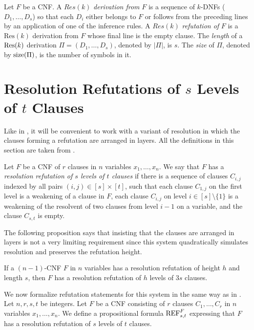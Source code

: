 \noindent Let $F$ be a CNF. A $\textit{Res}(k)$ \emph{derivation from} $F$ is a sequence of $k$-DNFs ($D_1,\ldots, D_s$) so that each $D_i$ either belongs to $F$ or follows from the preceding lines by an application of one of the inference rules. A $\textit{Res}(k)$ \emph{refutation of} $F$ is a $\text{Res}(k)$ derivation from $F$ whose final line is the empty clause. The \emph{length} of a $\textnormal{Res}(k)$ derivation $\Pi = (D_1,\ldots, D_s)$, denoted by $|\Pi|$, is $s$. The \emph{size} of $\Pi$, denoted by $\textnormal{size}(\Pi)$, is the number of symbols in it. 





\section{Resolution Refutations of $\textit{s}$ Levels of $\textit{t}$ Clauses}
\label{sec:res-refut-of-s-t-definition}
Like in \cite{Garlik2019-mfcs}, it will be convenient to work with a variant of resolution in  which the clauses forming a refutation are arranged in layers. All the definitions in this section are taken from \cite{Garlik2019-mfcs}.

\begin{definition}
 Let $F$ be a CNF of $r$ clauses in $n$ variables $x_1, \ldots, x_n$.  We say that $F$ has a \emph{resolution refutation of $s$ levels of $t$ clauses} if there is a sequence of clauses $C_{i,j}$ indexed by all pairs $(i,j) \in [s] \times [t]$, such that each clause $C_{1,j}$ on the first level is a weakening of a clause in $F$, each clause $C_{i,j}$ on level $i \! \in \! [s] \! \setminus \! \{1\}$ is a weakening of the resolvent of two clauses from level $i-1$ on a variable, and the clause $C_{s,t}$ is empty. 
\end{definition}

The following proposition says that insisting that the clauses are arranged in layers is not a very limiting requirement since this system quadratically simulates resolution and preserves the refutation height.

\begin{proposition}
\label{proposition:simulation-of-Res}
If a $(n-1)$-CNF $F$ in $n$ variables has a resolution refutation of height $h$ and length $s$, then $F$ has a resolution refutation of $h$ levels of $3s$ clauses. 
\end{proposition}

We now formalize refutation statements for this system in the same way as in \cite{Garlik2019-mfcs}. 
Let $n,r,s,t$ be integers. Let $F$ be a CNF consisting of $r$ clauses $C_1, \ldots , C_r$ in $n$ variables $x_1, \ldots , x_n$. We define a propositional formula $\textnormal{REF}^{F}_{s,t}$ expressing that $F$ has a resolution refutation of $s$ levels of $t$ clauses.

